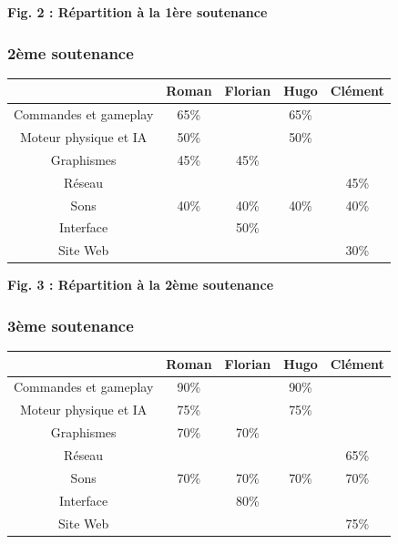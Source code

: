 \documentclass{article}
\begin{document}
\begin{center}
\bf{Fig. 2 : Répartition à la 1ère soutenance}
\end{center}

\subsubsection{2ème soutenance}

\begin{center}
\begin{tabular}{|c|c|c|c|c|}
\hline
 & Roman & Florian & Hugo & Clément \\
\hline
Commandes et gameplay & 65\% & & 65\% & \\
\hline
Moteur physique et IA & 50\% & & 50\% & \\
\hline
Graphismes & 45\% & 45\% & & \\
\hline
Réseau & & & & 45\% \\
\hline
Sons & 40\% & 40\% & 40\% & 40\% \\
\hline
Interface & & 50\% & & \\
\hline
Site Web & & & & 30\% \\
\hline
\end{tabular}
\end{center}

\begin{center}
\bf{Fig. 3 : Répartition à la 2ème soutenance}
\end{center}



\newpage
\subsubsection{3ème soutenance}

\begin{center}
\begin{tabular}{|c|c|c|c|c|}
\hline
 & Roman & Florian & Hugo & Clément \\
\hline
Commandes et gameplay & 90\% & & 90\% & \\
\hline
Moteur physique et IA & 75\% & & 75\% & \\
\hline
Graphismes & 70\% & 70\% & & \\
\hline
Réseau & & & & 65\% \\
\hline
Sons & 70\% & 70\% & 70\% & 70\% \\
\hline
Interface & & 80\% & & \\
\hline
Site Web & & & & 75\% \\
\hline
\end{tabular}
\end{center}
\end{document}
